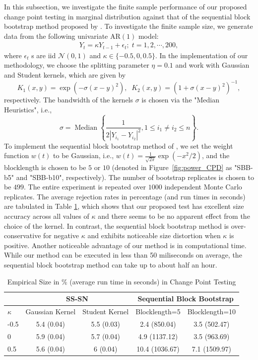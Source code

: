 \documentclass[11pt]{article}
\theoremstyle{plain}
\theoremstyle{definition}
\theoremstyle{remark}
\begin{document}
In this subsection, we investigate the finite sample performance of our proposed change point testing in marginal distribution against that of the sequential block bootstrap method proposed by \cite{sharipov2016sequential}. To investigate the finite sample size, we generate data from the following univariate AR$(1)$ model:
\begin{align}\label{eqn:data_null_CPD}
    Y_t=\kappa Y_{t-1}+\epsilon_t;\;t=1,2,\cdots, 200,
\end{align}
where $\epsilon_t$ s are iid $\mathcal{N}(0,1)$ and $\kappa \in \{-0.5, 0, 0.5\}$.
In the implementation of our methodology, we choose the splitting parameter $\eta=0.1$ and  work with Gaussian and Student kernels, which are given by
$$K_1(x,y)=\exp{(-\sigma(x-y)^2)},\;\;K_2(x,y)=(1+\sigma(x-y)^2)^{-1},$$
respectively. The bandwidth of the kernels $\sigma$ is chosen via the "Median Heuristics", i.e.,
$$\sigma=\operatorname{Median}\left\{\frac{1}{2|Y_{i_1}-Y_{i_2}|^2}, 1\leq i_1\neq i_2 \leq n\right\}.$$ To implement the sequential block bootstrap method of \cite{sharipov2016sequential}, we set the weight function $w(t)$ to be Gaussian, i.e., $w(t)=\frac{1}{\sqrt{2\pi}}\exp{(-x^2/2)}$, and the blocklength is chosen to be $5$ or $10$ (denoted in Figure~\ref{fig:power_CPD} as "SBB-b5" and "SBB-b10", respectively). The number of bootstrap replicates is chosen to be $499$. The entire experiment is repeated over $1000$ independent Monte Carlo replicates. The average rejection rates in percentage (and run times in seconds) are tabulated in Table \ref{tab:Size_CPD}, which shows that 
 our proposed test has excellent size accuracy across all values of $\kappa$ and there seems to be no apparent effect from the choice of the kernel. In contrast, the sequential block bootstrap method is over-conservative for negative $\kappa$ and exhibits noticeable size distortion when $\kappa$ is positive. Another noticeable advantage of our method is  in computational time. 
 While our method can be executed in less than 50 miliseconds on average, the sequential block bootstrap method can take up to about half an hour. 
\begin{table}
\centering
    \caption{Empirical Size in \% (average run time in seconds) in Change Point Testing}
    \label{tab:Size_CPD}
    \begin{tabular}{@{}l|cc|cc@{}}
         \hline
     & \multicolumn{2}{c}{SS-SN} & \multicolumn{2}{c}{Sequential Block Bootstrap}\\
    \hline 
        $\kappa$ & Gaussian Kernel & Student Kernel & Blocklength=5 & Blocklength=10\\
        \hline 
       -0.5 & 5.4 (0.04)& 5.5 (0.03)& 2.4 (850.04)& 3.5 (502.47)\\ 
        0 & 5.9 (0.04)& 5.7 (0.04)& 4.9 (1137.12)& 3.5 (963.69)\\ 
        0.5 & 5.6 (0.04)& 6  (0.04)& 10.4 (1036.67)& 7.1 (1509.97)\\ \hline
    \end{tabular}
\end{table}
 
\end{document}
